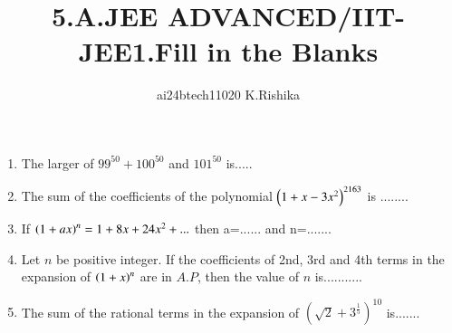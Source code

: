 \documentclass[journal,12pt,twocolumn]{IEEEtran}
\theoremstyle{remark}
\begin{document}

\vspace{3cm}

\title{5.A.JEE ADVANCED/IIT-JEE1.Fill in the Blanks}
\author{ai24btech11020 K.Rishika}

\maketitle
\bigskip   
\renewcommand{\thefigure}{\theenumi}
\renewcommand{\thetable}{\theenumi}     
\begin{enumerate}[start=1]
\item The larger of $99^{50}+100^{50}$ and $101^{50}$ is.....
	\phantom{2cm}\hspace{5cm}\hfill{}\\
\item The sum of the coefficients of the polynomial $\left(1+x-3x^2\right)^{2163}$ is ........
	\hfill {}\\
\item If $\left(1+ax\right)^n=1+8x+24x^2+...$ then a=...... and n=.......
	\hfill {}\\
\item Let $n$ be positive integer. If the coefficients of 2nd, 3rd and 4th terms in the expansion of $\left(1 + x\right)^n$ are in $A.P$, then the value of $n$ is...........
	\hfill {}\\
\item The sum of the rational terms in the expansion of $(\sqrt{2}+3^\frac{1}{5})^{10}$ is.......
	\hfill {}
\end{enumerate}
\end{document}
